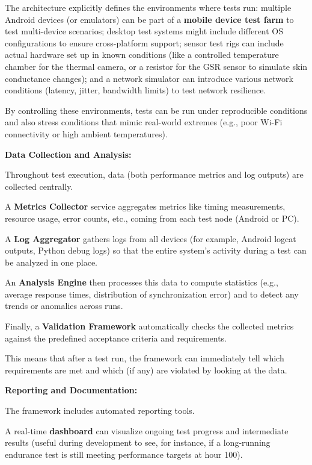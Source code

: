 {{The architecture explicitly defines the environments where tests run: multiple Android devices (or emulators) can be part of a \textbf{mobile device test farm}
to test multi-device scenarios; desktop test systems might include different OS
configurations to ensure cross-platform support; sensor test rigs can include
actual hardware set up in known conditions (like a controlled temperature
chamber for the thermal camera, or a resistor for the GSR sensor to simulate
skin conductance changes); and a network simulator can introduce various network
conditions (latency, jitter, bandwidth limits) to test network resilience.

By controlling these environments, tests can be run under reproducible
conditions and also stress conditions that mimic real-world extremes (e.g., poor
Wi-Fi connectivity or high ambient temperatures).

\textbf{Data Collection and Analysis:}

Throughout test execution, data (both performance metrics and log outputs) are
collected centrally.

A \textbf{Metrics Collector}
service aggregates metrics like timing measurements, resource usage, error
counts, etc., coming from each test node (Android or PC).

A \textbf{Log Aggregator}
gathers logs from all devices (for example, Android logcat outputs, Python debug
logs) so that the entire system's activity during a test can be analyzed in one
place.

An \textbf{Analysis Engine}
then processes this data to compute statistics (e.g., average response times,
distribution of synchronization error) and to detect any trends or anomalies
across runs.

Finally, a \textbf{Validation Framework}
automatically checks the collected metrics against the predefined acceptance
criteria and requirements.

This means that after a test run, the framework can immediately tell which
requirements are met and which (if any) are violated by looking at the data.

\textbf{Reporting and Documentation:}

The framework includes automated reporting tools.

A real-time \textbf{dashboard}
can visualize ongoing test progress and intermediate results (useful during
development to see, for instance, if a long-running endurance test is still
meeting performance targets at hour 100).

}}
